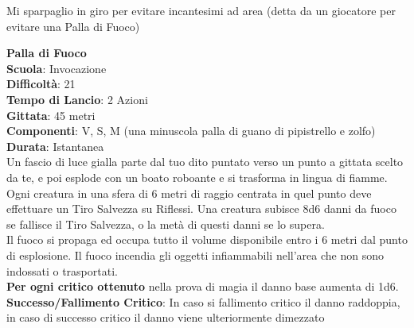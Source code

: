 \begin{multicols}{2}
\medskip

\begin{tcolorbox}[enhanced,arc=5pt,boxrule=0.3pt]{
		Mi sparpaglio in giro per evitare incantesimi ad area (detta da un giocatore per evitare una Palla di Fuoco)
}\end{tcolorbox}

\medskip\textbf{Palla di Fuoco}\\
\textbf{Scuola}: Invocazione\\
\textbf{Difficoltà}: 21\\
\textbf{Tempo di Lancio}: 2 Azioni\\
\textbf{Gittata}: 45 metri\\
\textbf{Componenti}: V, S, M (una minuscola palla di guano di pipistrello e zolfo)\\
\textbf{Durata}: Istantanea\\
Un fascio di luce gialla parte dal tuo dito puntato verso un punto a gittata scelto da te, e poi esplode con un boato roboante e si trasforma in lingua di fiamme.\\
Ogni creatura in una sfera di 6 metri di raggio centrata in quel punto deve effettuare un Tiro Salvezza su Riflessi. Una creatura subisce 8d6 danni da fuoco se fallisce il Tiro Salvezza, o la metà di questi danni se lo supera.\\
Il fuoco si propaga ed occupa tutto il volume disponibile entro i 6 metri dal punto di esplosione. Il fuoco incendia gli oggetti infiammabili nell'area che non sono indossati o trasportati.\\
\textbf{Per ogni critico ottenuto} nella prova di magia il danno base aumenta di 1d6.\\
\textbf{Successo/Fallimento Critico}: In caso si fallimento critico il danno raddoppia, in caso di successo critico il danno viene ulteriormente dimezzato


\end{multicols}
